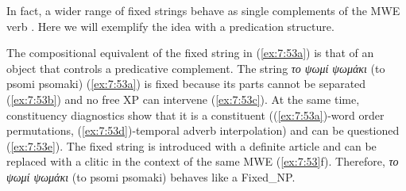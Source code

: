 \documentclass[output=paper]{langsci/langscibook}
\begin{document}
In fact, a wider range of fixed strings behave as single complements of the MWE verb \citep{Samaridi:Markantonatou:14}. Here we will exemplify the idea with a predication structure. 

The compositional equivalent of the fixed string in (\ref{ex:7:53a}) is that of an object that controls a predicative complement. The string  \textit{το ψωμί ψωμάκι} (to psomi psomaki) (\ref{ex:7:53a}) is fixed because its parts cannot be separated (\ref{ex:7:53b}) and no free XP can intervene (\ref{ex:7:53c}). At the same time, constituency diagnostics show that it is a constituent ((\ref{ex:7:53a})-word order permutations, (\ref{ex:7:53d})-temporal adverb interpolation) and can be questioned (\ref{ex:7:53e}).  The fixed string is introduced with a definite article and can be replaced with a clitic in the context of the same MWE (\ref{ex:7:53}f). Therefore,  \textit{το ψωμί ψωμάκι} (to psomi psomaki) behaves like a Fixed\_NP. 

\ea\label{ex:7:53}
\z
\z
\end{document}
